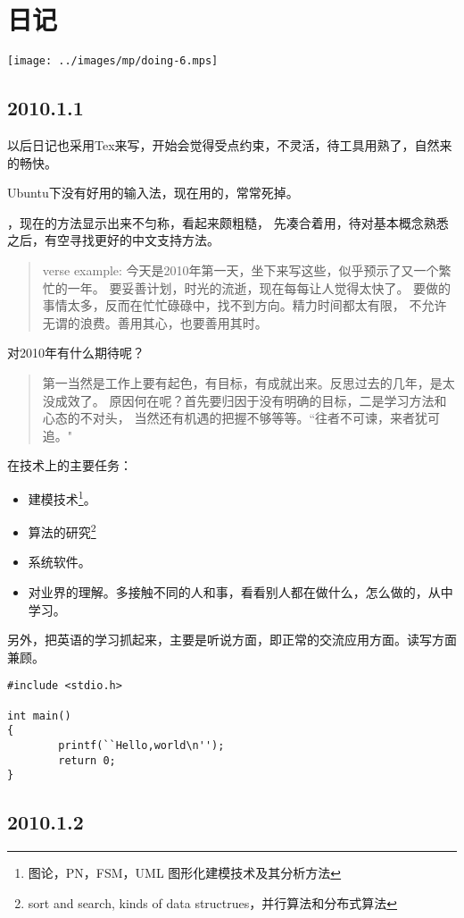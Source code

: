 \section{日记}
\texttt{[image: ../images/mp/doing-6.mps]}
\subsection{2010.1.1}
以后日记也采用Tex来写，开始会觉得受点约束，不灵活，待工具用熟了，自然来的畅快。

Ubuntu下没有好用的输入法，现在用的，常常死掉。

，现在的方法显示出来不匀称，看起来颇粗糙，
先凑合着用，待对基本概念熟悉之后，有空寻找更好的中文支持方法。

\begin{verse}
verse example:
今天是2010年第一天，坐下来写这些，似乎预示了又一个繁忙的一年。
要妥善计划，时光的流逝，现在每每让人觉得太快了。
要做的事情太多，反而在忙忙碌碌中，找不到方向。精力时间都太有限，
不允许无谓的浪费。善用其心，也要善用其时。
\end{verse}

对2010年有什么期待呢？
\begin{quote}
第一当然是工作上要有起色，有目标，有成就出来。反思过去的几年，是太没成效了。
原因何在呢？首先要归因于没有明确的目标，二是学习方法和心态的不对头，
当然还有机遇的把握不够等等。“往者不可谏，来者犹可追。"
\end{quote}

在技术上的主要任务：
\begin{itemize}
  \item 建模技术\footnote{图论，PN，FSM，UML 图形化建模技术及其分析方法}。
  \item 算法的研究\footnote{sort and search, kinds of data structrues，并行算法和分布式算法}
  \item 系统软件。
  \item 对业界的理解。多接触不同的人和事，看看别人都在做什么，怎么做的，从中学习。
\end{itemize}

另外，把英语的学习抓起来，主要是听说方面，即正常的交流应用方面。读写方面兼顾。

\begin{verbatim}
#include <stdio.h>

int main()
{
        printf(``Hello,world\n'');
        return 0;
}
\end{verbatim}

\subsection{2010.1.2}
